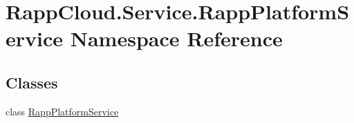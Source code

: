 \hypertarget{namespaceRappCloud_1_1Service_1_1RappPlatformService}{\section{Rapp\-Cloud.\-Service.\-Rapp\-Platform\-Service Namespace Reference}
\label{namespaceRappCloud_1_1Service_1_1RappPlatformService}
}
\subsection*{Classes}
\begin{DoxyCompactItemize}
\item 
class \hyperlink{classRappCloud_1_1Service_1_1RappPlatformService_1_1RappPlatformService}{Rapp\-Platform\-Service}
\end{DoxyCompactItemize}
